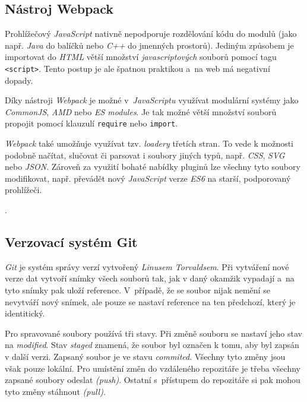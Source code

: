 \documentclass[a4paper,12pt]{article}
\def\code#1{\texttt{#1}}
\begin{document}
\subsection{Nástroj Webpack}
Prohlížečový \textit{JavaScript} nativně nepodporuje rozdělování kódu do modulů (jako např. \textit{Java} do balíčků nebo \textit{C++} do jmenných prostorů). Jediným způsobem je importovat do \textit{HTML} větší množství \textit{javascriptových} souborů pomocí tagu \code{<script>}. Tento postup je ale špatnou praktikou a~na web má negativní dopady.~\cite{jsconcat}

Díky nástroji \textit{Webpack} je možné v~\textit{JavaScriptu} využívat modulární systémy jako \textit{CommonJS}, \textit{AMD} nebo \textit{ES modules}. Je tak možné větší množství souborů propojit pomocí klauzulí \code{require} nebo \code{import}.~\cite{webpack}

\textit{Webpack} také umožňuje využívat tzv. \textit{loadery} třetích stran. To vede k možnosti podobně načítat, slučovat či parsovat i soubory jiných typů, např. \textit{CSS}, \textit{SVG} nebo \textit{JSON}. Zároveň za využití bohaté nabídky pluginů lze všechny tyto soubory modifikovat, např. převádět nový \textit{JavaScript} verze \textit{ES6} na starší, podporovaný prohlížeči.~\cite{webpack}

.

\subsection{Verzovací systém Git}

\textit{Git} je systém správy verzí vytvořený \textit{Linusem Torvaldsem}. Při vytváření nové verze dat vytvoří snímky všech souborů tak, jak v daný okamžik vypadají a~na tyto snímky pak uloží reference. V~případě, že se soubor nijak nemění se nevytváří nový snímek, ale pouze se nastaví reference na ten předchozí, který je identitický.~\cite{git}

Pro spravované soubory používá tři stavy. Při změně souboru se nastaví jeho stav na \textit{modified}. Stav \textit{staged} znamená, že soubor byl označen k tomu, aby byl zapsán v další verzi. Zapsaný soubor je ve stavu \textit{commited}. Všechny tyto změny jsou však pouze lokální. Pro umístění změn do vzdáleného repozitáře je třeba všechny zapsané soubory odeslat \textit{(push)}. Ostatní s~přístupem do repozitáře si pak mohou tyto změny stáhnout \textit{(pull)}.~\cite{git}
\end{document}
